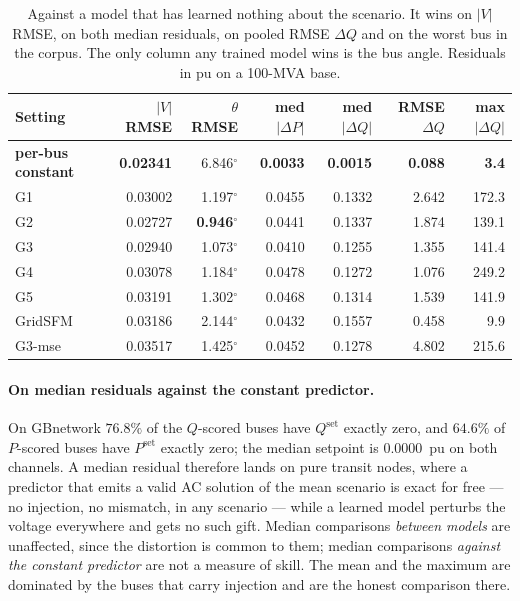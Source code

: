 \documentclass[10pt]{article}
\begin{document}
\begin{table}[H]
\centering\footnotesize
\setlength{\tabcolsep}{4pt}
\begin{tabular}{lrrrrrr}
\toprule
Setting & $|V|$ RMSE & $\theta$ RMSE & med $|\Delta P|$ & med $|\Delta Q|$ & RMSE $\Delta Q$ & max $|\Delta Q|$\\
\midrule
\textbf{per-bus constant} & \textbf{0.02341} & 6.846$^\circ$ & \textbf{0.0033} & \textbf{0.0015} & \textbf{0.088} & \textbf{3.4}\\
\midrule
G1 & 0.03002 & 1.197$^\circ$ & 0.0455 & 0.1332 & 2.642 & 172.3\\
G2 & 0.02727 & \textbf{0.946}$^\circ$ & 0.0441 & 0.1337 & 1.874 & 139.1\\
G3 & 0.02940 & 1.073$^\circ$ & 0.0410 & 0.1255 & 1.355 & 141.4\\
G4 & 0.03078 & 1.184$^\circ$ & 0.0478 & 0.1272 & 1.076 & 249.2\\
G5 & 0.03191 & 1.302$^\circ$ & 0.0468 & 0.1314 & 1.539 & 141.9\\
GridSFM & 0.03186 & 2.144$^\circ$ & 0.0432 & 0.1557 & 0.458 & 9.9\\
G3-mse & 0.03517 & 1.425$^\circ$ & 0.0452 & 0.1278 & 4.802 & 215.6\\
\bottomrule
\end{tabular}
\caption{Against a model that has learned nothing about the scenario.  It wins
on $|V|$ RMSE, on both median residuals, on pooled RMSE $\Delta Q$ and on the
worst bus in the corpus.  The only column any trained model wins is the bus
angle.  Residuals in pu on a 100-MVA base.}
\end{table}

\paragraph{On median residuals against the constant predictor.} On GBnetwork
$76.8\%$ of the $Q$-scored buses have $Q^{\mathrm{set}}$ exactly zero, and
$64.6\%$ of $P$-scored buses have $P^{\mathrm{set}}$ exactly zero; the median
setpoint is $0.0000$~pu on both channels. A median residual therefore lands on
pure transit nodes, where a predictor that emits a valid AC solution of the
mean scenario is exact for free --- no injection, no mismatch, in any scenario
--- while a learned model perturbs the voltage everywhere and gets no such
gift. Median comparisons \emph{between models} are unaffected, since the
distortion is common to them; median comparisons \emph{against the constant
predictor} are not a measure of skill. The mean and the maximum are dominated
by the buses that carry injection and are the honest comparison there.
\end{document}
